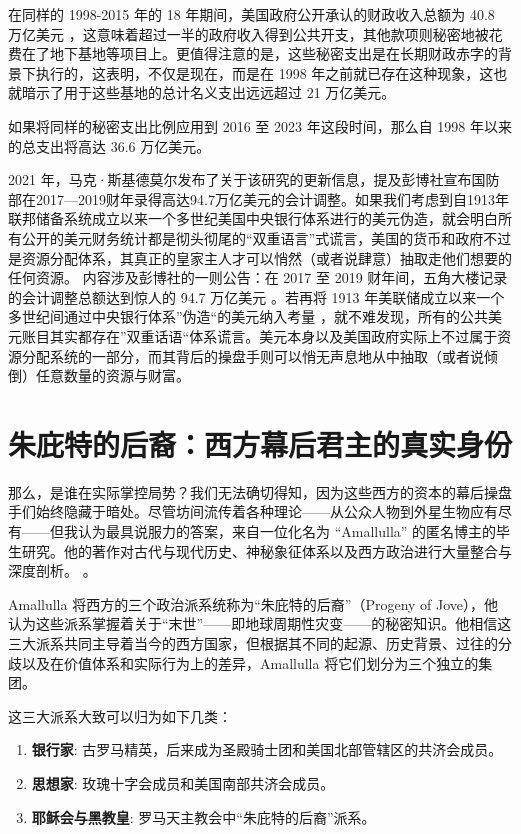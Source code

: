 \documentclass[10pt,twocolumn,letterpaper]{article}
\begin{document}
在同样的 1998-2015 年的 18 年期间，美国政府公开承认的财政收入总额为 40.8 万亿美元 \cite{15}，这意味着超过一半的政府收入得到公共开支，其他款项则秘密地被花费在了地下基地等项目上。更值得注意的是，这些秘密支出是在长期财政赤字的背景下执行的，这表明，不仅是现在，而是在 1998 年之前就已存在这种现象，这也就暗示了用于这些基地的总计名义支出远远超过 21 万亿美元。

如果将同样的秘密支出比例应用到 2016 至 2023 年这段时间，那么自 1998 年以来的总支出将高达 36.6 万亿美元。

2021 年，马克·斯基德莫尔发布了关于该研究的更新信息，提及彭博社宣布国防部在2017—2019财年录得高达94.7万亿美元的会计调整\cite{17,18}。如果我们考虑到自1913年联邦储备系统成立以来一个多世纪美国中央银行体系进行的美元伪造\cite{37}，就会明白所有公开的美元财务统计都是彻头彻尾的“双重语言”式谎言，美国的货币和政府不过是资源分配体系，其真正的皇家主人才可以悄然（或者说肆意）抽取走他们想要的任何资源。
内容涉及彭博社的一则公告：在 2017 至 2019 财年间，五角大楼记录的会计调整总额达到惊人的 94.7 万亿美元 \cite{17,18}。若再将 1913 年美联储成立以来一个多世纪间通过中央银行体系”伪造“的美元纳入考量 \cite{37}，就不难发现，所有的公共美元账目其实都存在”双重话语“体系谎言。美元本身以及美国政府实际上不过属于资源分配系统的一部分，而其背后的操盘手则可以悄无声息地从中抽取（或者说倾倒）任意数量的资源与财富。

\section{朱庇特的后裔：西方幕后君主的真实身份}
那么，是谁在实际掌控局势？我们无法确切得知，因为这些西方的资本的幕后操盘手们始终隐藏于暗处。尽管坊间流传着各种理论——从公众人物到外星生物应有尽有——但我认为最具说服力的答案，来自一位化名为 “Amallulla” 的匿名博主的毕生研究。他的著作对古代与现代历史、神秘象征体系以及西方政治进行大量整合与深度剖析。 \cite{33,34}。

Amallulla 将西方的三个政治派系统称为“朱庇特的后裔”（Progeny of Jove），他认为这些派系掌握着关于“末世”——即地球周期性灾变——的秘密知识。他相信这三大派系共同主导着当今的西方国家，但根据其不同的起源、历史背景、过往的分歧以及在价值体系和实际行为上的差异，Amallulla 将它们划分为三个独立的集团。

这三大派系大致可以归为如下几类：

\begin{flushleft}
\begin{enumerate}
    \item \textbf{银行家}: 古罗马精英，后来成为圣殿骑士团和美国北部管辖区的共济会成员。
    \item \textbf{思想家}: 玫瑰十字会成员和美国南部共济会成员。
    \item \textbf{耶稣会与黑教皇}: 罗马天主教会中“朱庇特的后裔”派系。
\end{enumerate}
\end{flushleft}
\end{document}
